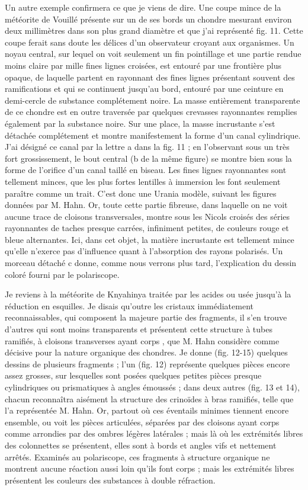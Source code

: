 \documentclass[a4paper, 12pt, oneside, french]{book}
\begin{document}
Un autre exemple confirmera ce que je viens de dire. Une coupe mince de la météorite de Vouillé présente sur un de ses bords un chondre mesurant environ deux millimètres dans son plus grand diamètre et que j'ai représenté fig. 11. Cette coupe ferait sans doute les délices d'un observateur croyant aux organismes. Un noyau central, sur lequel on voit seulement un fin pointillage et une partie rendue moins claire par mille fines lignes croisées, est entouré par une frontière plus opaque, de laquelle partent en rayonnant des fines lignes présentant souvent des ramifications et qui se continuent jusqu'au bord, entouré par une ceinture en demi-cercle de substance complétement noire. La masse entièrement transparente de ce chondre est en outre traversée par quelques crevasses rayonnantes remplies également par la substance noire. Sur une place, la masse incrustante s'est détachée complétement et montre manifestement la forme d'un canal cylindrique. J'ai désigné ce canal par la lettre a dans la fig. 11 ; en l'observant sous un très fort grossissement, le bout central (b de la même figure) se montre bien sous la forme de l'orifice d'un canal taillé en biseau. Les fines lignes rayonnantes sont tellement minces, que les plus fortes lentilles à immersion les font seulement paraître comme un trait. C'est donc une Urania modèle, suivant les figures données par M. Hahn. Or, toute cette partie fibreuse, dans laquelle on ne voit aucune trace de cloisons transversales, montre sous les Nicols croisés des séries rayonnantes de taches presque carrées, infiniment petites, de couleurs rouge et bleue alternantes. Ici, dans cet objet, la matière incrustante est tellement mince qu'elle n'exerce pas d'influence quant à l'absorption des rayons polarisés. Un morceau détaché c donne, comme nous verrons plus tard, l'explication du dessin coloré fourni par le polariscope.

Je reviens à la météorite de Knyahinya traitée par les acides ou usée jusqu'à la réduction en esquilles. Je disais qu'outre les cristaux immédiatement reconnaissables, qui composent la majeure partie des fragments, il s'en trouve d'autres qui sont moins transparents et présentent cette structure à tubes ramifiés, à cloisons transverses \og ayant corps \fg, que M. Hahn considère comme décisive pour la nature organique des chondres. Je donne (fig. 12-15) quelques dessins de plusieurs fragments ; l'un (fig. 12) représente quelques pièces encore assez grosses, sur lesquelles sont posées quelques petites pièces presque cylindriques ou prismatiques à angles émoussés ; dans deux autres (fig. 13 et 14), chacun reconnaîtra aisément la structure des crinoïdes à bras ramifiés, telle que l'a représentée M. Hahn. Or, partout où ces éventails minimes tiennent encore ensemble, ou voit les pièces articulées, séparées par des cloisons \og ayant corps \fg comme arrondies par des ombres légères latérales ; mais là où les extrémités libres des colonnettes se présentent, elles sont à bords et angles vifs et nettement arrêtés. Examinés au polariscope, ces fragments à structure organique ne montrent aucune réaction aussi loin qu'ils font corps ; mais les extrémités libres présentent les couleurs des substances à double réfraction.
\end{document}
